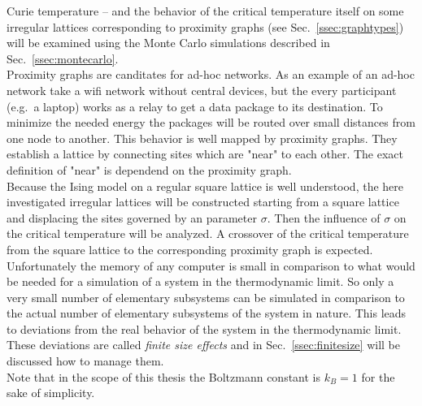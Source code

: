 Curie temperature -- and the behavior of the critical temperature itself
on some irregular lattices corresponding to proximity graphs
(see Sec.\ \ref{ssec:graphtypes}) will be examined using the Monte
Carlo simulations described in Sec.\ \ref{ssec:montecarlo}.\\
Proximity graphs are canditates for ad-hoc networks. As an example of an
ad-hoc network take a wifi network without central devices, but the every
participant (e.g.\ a laptop) works as a relay to get a data package to its
destination. To minimize the needed energy the packages will be routed
over small distances from one node to another. This behavior is well mapped
by proximity graphs. They establish a lattice by connecting sites which
are "near" to each other. The exact definition of "near" is dependend on
the proximity graph.\\
Because the Ising model on a regular square lattice is well understood,
the here investigated irregular lattices will be constructed starting from
a square lattice and displacing the sites governed by an parameter \(\sigma\).
Then the influence of \(\sigma\) on the critical temperature will be
analyzed. A crossover of the critical temperature from the square lattice
to the corresponding proximity graph is expected.\\

Unfortunately the memory of any computer is small in comparison to what
would be needed for a simulation of a system in the
thermodynamic limit. So only a very small number of elementary subsystems can be
simulated in comparison to the actual number of elementary subsystems
of the system in nature. This leads to deviations from the real behavior
of the system in the thermodynamic limit. These deviations are called
\emph{finite size effects} and in Sec.\ \ref{ssec:finitesize} will be
discussed how to manage them.\\

Note that in the scope of this thesis the Boltzmann constant is \(k_{B}=1\)
for the sake of simplicity.
